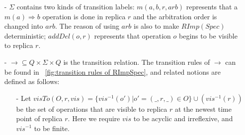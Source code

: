 \begin{itemize}

\item[-] {\color {red}$\Sigma$ contains two kinds of transition labels: $m(a,b,r,\mathit{arb})$ represents that a $m(a) \Rightarrow b$ operation is done in replica $r$ and the arbitration order is changed into $\mathit{arb}$. The reason of using $\mathit{arb}$ is also to make $\mathit{RImp}(\mathit{Spec})$ deterministic; $\mathit{addDel}(o,r)$ represents that operation $o$ begins to be visible to replica $r$.}


\item[-] $\rightarrow \subseteq Q \times \Sigma \times Q$ is the transition relation. The transition rules of $\rightarrow$ can be found in \figurename~\ref{fig:transition rules of RImpSpec}, and related notions are defined as follows:


    \begin {itemize}
    \item[-] {\color {red}Let $\mathit{visTo}(O,r,\mathit{vis}) = \{ vis^{-1}(o') \vert o'=(\_,r,\_) \in O \} \cup (vis^{-1}(r))$ be the set of operations that are visible to replica $r$ at the newest time point of replica $r$. Here we require $\mathit{vis}$ to be acyclic and irreflexive, and $\mathit{vis}^{-1}$ to be finite.}
    


\end{itemize}
\end{itemize}
